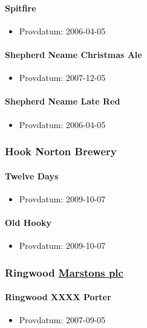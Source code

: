 \documentclass[11pt]{article}
\begin{document}
\paragraph{Spitfire}
\label{sec:org9821fc7}
\begin{itemize}
\item Provdatum: 2006-04-05
\end{itemize}
\paragraph{Shepherd Neame Christmas Ale}
\label{sec:orgc48aa21}
\begin{itemize}
\item Provdatum: 2007-12-05
\end{itemize}
\paragraph{Shepherd Neame Late Red}
\label{sec:org79ecd32}
\begin{itemize}
\item Provdatum: 2006-04-05
\end{itemize}
\subsubsection{Hook Norton Brewery}
\label{sec:org47aaf4c}
\paragraph{Twelve Days}
\label{sec:org68d9c34}
\begin{itemize}
\item Provdatum: 2009-10-07
\end{itemize}
\paragraph{Old Hooky}
\label{sec:org4ed1005}
\begin{itemize}
\item Provdatum: 2009-10-07
\end{itemize}
\subsubsection{Ringwood \underline{Marstons plc}}
\label{sec:org9a2289a}
\paragraph{Ringwood XXXX Porter}
\label{sec:org1289902}
\begin{itemize}
\item Provdatum: 2007-09-05
\end{itemize}
\end{document}
